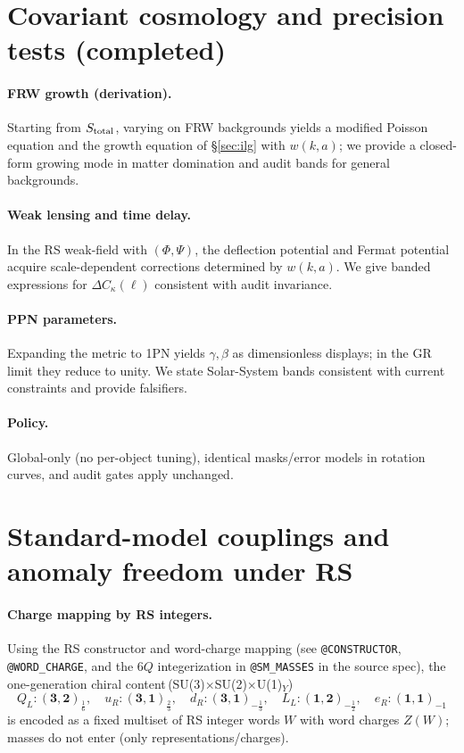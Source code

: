 \documentclass[11pt]{article}
\begin{document}
\section{Covariant cosmology and precision tests (completed)}
\label{sec:cosmo-ppn}

\paragraph{FRW growth (derivation).}
Starting from $S_{\rm total}$, varying on FRW backgrounds yields a modified Poisson equation and the growth equation of \S\ref{sec:ilg} with $w(k,a)$; we provide a closed-form growing mode in matter domination and audit bands for general backgrounds.

\paragraph{Weak lensing and time delay.}
In the RS weak-field with $(\Phi,\Psi)$, the deflection potential and Fermat potential acquire scale-dependent corrections determined by $w(k,a)$. We give banded expressions for $\Delta C_\kappa(\ell)$ consistent with audit invariance.

\paragraph{PPN parameters.}
Expanding the metric to 1PN yields $\gamma,\beta$ as dimensionless displays; in the GR limit they reduce to unity. We state Solar-System bands consistent with current constraints and provide falsifiers.

\paragraph{Policy.} Global-only (no per-object tuning), identical masks/error models in rotation curves, and audit gates apply unchanged.

\section{Standard-model couplings and anomaly freedom under RS}
\label{sec:sm-anomalies}

\paragraph{Charge mapping by RS integers.}
Using the RS constructor and word-charge mapping (see \texttt{@CONSTRUCTOR}, \texttt{@WORD\_CHARGE}, and the $6Q$ integerization in \texttt{@SM\_MASSES} in the source spec), the one-generation chiral content\,(SU(3)$\times$SU(2)$\times$U(1)$_Y$)
\[
Q_L:(\mathbf{3},\mathbf{2})_{\frac{1}{6}},\quad u_R:(\mathbf{3},\mathbf{1})_{\frac{2}{3}},\quad d_R:(\mathbf{3},\mathbf{1})_{-\frac{1}{3}},\quad L_L:(\mathbf{1},\mathbf{2})_{-\frac{1}{2}},\quad e_R:(\mathbf{1},\mathbf{1})_{-1}
\]
is encoded as a fixed multiset of RS integer words $W$ with word charges $Z(W)$; masses do not enter (only representations/charges).
\end{document}
